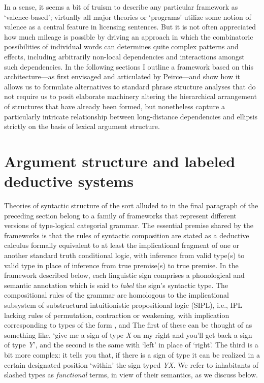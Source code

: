 \documentclass[output=paper,colorlinks,citecolor=brown]{langscibook}
\begin{document}
In a sense, it seems a bit of truism to describe any particular
framework as `valence-based'; virtually all major theories or
`programs' utilize some notion of valence as a central feature in
licensing sentences. But it is not often appreciated how much mileage
is possible by driving an approach in which the combinatoric
possibilities of individual words can determines quite complex
patterns and effects, including arbitrarily non-local dependencies and
interactions amongst such dependencies. In the following sections I
outline a framework based on this architecture---as first envisaged
and articulated by Peirce---and show how it allows us to formulate
alternatives to standard phrase structure analyses that do not require
us to posit elaborate machinery altering the hierarchical arrangement
of structures that have already been formed, but nonetheless capture a
particularly intricate relationship between long-distance dependencies
and ellipsis strictly on the basis of lexical argument structure.



\section{Argument structure and labeled deductive systems\label{sec:argstruc}}

Theories of syntactic structure of the sort alluded to in the final
paragraph of the preceding section belong to a family of frameworks
that represent different versions of type-logical categorial grammar.
The essential premise shared by the frameworks is that the rules of
syntactic composition are stated as a deductive calculus formally
equivalent to at least the implicational fragment of one or another
standard truth conditional logic, with inference from valid type(s) to
valid type in place of inference from true premise(s) to true
premise. In the framework described below, each linguistic sign
comprises a phonological and semantic annotation which is said to
\textsl{label} the sign's syntactic type. The compositional rules of
the grammar are homologous to the implicational subsystem of
substructural intuitionistic propositional logic (SIPL), i.e.,
IPL lacking rules of permutation, contraction or weakening, with implication
corresponding to types of the form ,  and  The
first of these can be thought of as something like, `give me a sign of
type \textit{X} on my right and you'll get back a sign of type  \textit{Y}', and the
second is the same with `left' in place of `right'. The third is a bit
more complex: it tells you that, if there is a sign of type it can be
realized in a certain designated position `within' the sign typed
\textit{Y}\vs \textit{X}. We refer to inhabitants of slashed types as
\textsl{functional} terms, in view of their semantics, as we discuss below.
\end{document}
